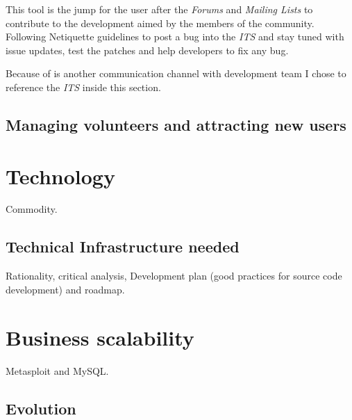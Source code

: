 \documentclass[11pt]{scrartcl}
\begin{document}
\par This tool is the jump for the user after the \emph{Forums} and \emph{Mailing Lists} to contribute to the development aimed by the members of the community. Following Netiquette guidelines to post a bug into the \emph{ITS} and stay tuned with issue updates, test the patches and help developers to fix any bug.

\par Because of is another communication channel with development team I chose to reference the \emph{ITS} inside this section.


\subsection{Managing volunteers and attracting new users}
\label{sub:volunteers-users}


\section{Technology}
\label{sec:technology}

\par Commodity.


\subsection{Technical Infrastructure needed}
\label{sub:infrastructure}

\par Rationality, critical analysis, Development plan (good practices for source code development) and roadmap.


\section{Business scalability}
\label{sec:scalability}

\par Metasploit and MySQL.


\subsection{Evolution}
\label{sub:evolution}
\end{document}
